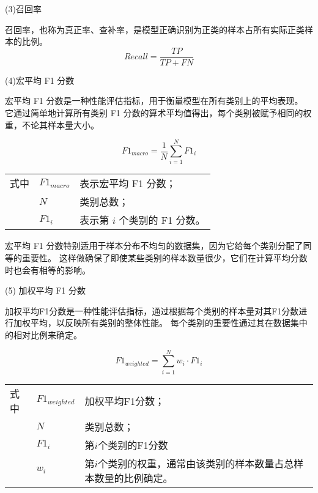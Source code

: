 (3)召回率\par
召回率，也称为真正率、查补率，是模型正确识别为正类的样本占所有实际正类样本的比例。
\begin{equation}
	\label{eq:val_score3}
	Recall = \frac{TP}{TP + FN}
\end{equation}

(4)宏平均 F1 分数\par
宏平均 F1 分数是一种性能评估指标，用于衡量模型在所有类别上的平均表现。
它通过简单地计算所有类别 F1 分数的算术平均值得出，每个类别被赋予相同的权重，不论其样本量大小。

\begin{equation}
	\label{eq:val_score4}
	F1_{macro} = \frac{1}{N} \sum\limits_{i=1}^{N} F1_i
\end{equation}
\begin{flushleft}
	\renewcommand\arraystretch{1.25}
	\begin{tabularx}{\textwidth}{@{}>{\normalsize\rm}l@{\quad}>{\normalsize\rm}l@{——}>{\normalsize\rm}X@{}}
		式中 & $F1_{macro}$ & 表示宏平均 F1 分数；        \\
		   & $N$          & 类别总数；               \\
		   & $F1_i$       & 表示第 $i$ 个类别的 F1 分数。 \\
	\end{tabularx}\vspace{.5ex}%
\end{flushleft}

宏平均 F1 分数特别适用于样本分布不均匀的数据集，因为它给每个类别分配了同等的重要性。
这样做确保了即使某些类别的样本数量很少，它们在计算平均分数时也会有相等的影响。

(5) 加权平均 F1 分数\par
加权平均F1分数是一种性能评估指标，通过根据每个类别的样本量对其F1分数进行加权平均，以反映所有类别的整体性能。
每个类别的重要性通过其在数据集中的相对比例来确定。

\begin{equation}
	\label{eq:val_score5}
	F1_{weighted} = \sum\limits_{i=1}^{N} w_i \cdot F1_i
\end{equation}
\begin{flushleft}
	\renewcommand\arraystretch{1.25}
	\begin{tabularx}{\textwidth}{@{}>{\normalsize\rm}l@{\quad}>{\normalsize\rm}l@{——}>{\normalsize\rm}X@{}}
		式中 & $F1_{weighted}$ & 加权平均F1分数；                          \\
		   & $N$             & 类别总数；                              \\
		   & $F1_i$          & 第$i$个类别的F1分数                       \\
		   & $w_i$           & 第$i$个类别的权重，通常由该类别的样本数量占总样本数量的比例确定。 \\
	\end{tabularx}\vspace{.5ex}%
\end{flushleft}

